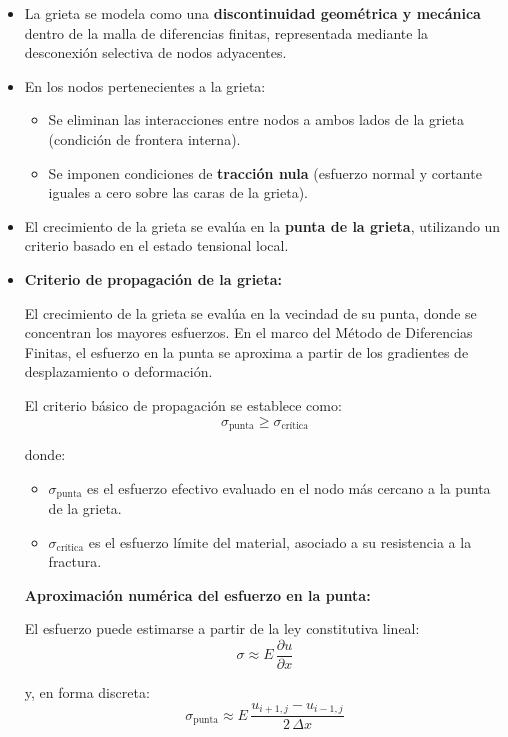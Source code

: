 \documentclass[a4paper,10pt]{exam}
\begin{document}
\begin{itemize}
\item La grieta se modela como una \textbf{discontinuidad geométrica y mecánica} dentro de la malla de diferencias finitas, representada mediante la desconexión selectiva de nodos adyacentes.

\item En los nodos pertenecientes a la grieta:
\begin{itemize}
\item Se eliminan las interacciones entre nodos a ambos lados de la grieta (condición de frontera interna).
\item Se imponen condiciones de \textbf{tracción nula} (esfuerzo normal y cortante iguales a cero sobre las caras de la grieta).
\end{itemize}

\item El crecimiento de la grieta se evalúa en la \textbf{punta de la grieta}, utilizando un criterio basado en el estado tensional local.

\item \textbf{Criterio de propagación de la grieta:}

El crecimiento de la grieta se evalúa en la vecindad de su punta, donde se concentran los mayores esfuerzos. En el marco del Método de Diferencias Finitas, el esfuerzo en la punta se aproxima a partir de los gradientes de desplazamiento o deformación.

El criterio básico de propagación se establece como:
\[
\sigma_{\text{punta}} \geq \sigma_{\text{crítica}}
\]

donde:
\begin{itemize}
\item \(\sigma_{\text{punta}}\) es el esfuerzo efectivo evaluado en el nodo más cercano a la punta de la grieta.
\item \(\sigma_{\text{crítica}}\) es el esfuerzo límite del material, asociado a su resistencia a la fractura.
\end{itemize}

\vspace{0.2cm}

\textbf{Aproximación numérica del esfuerzo en la punta:}

El esfuerzo puede estimarse a partir de la ley constitutiva lineal:
\[
\sigma \approx E \, \frac{\partial u}{\partial x}
\]

y, en forma discreta:
\[
\sigma_{\text{punta}} \approx E \, \frac{u_{i+1,j} - u_{i-1,j}}{2\,\Delta x}
\]


\end{itemize}
\end{document}
